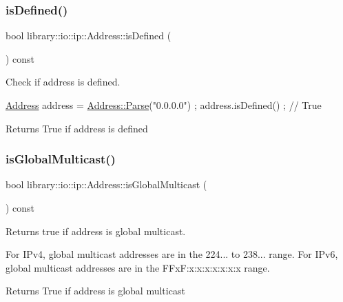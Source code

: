 \subsubsection{\texorpdfstring{is\+Defined()}{isDefined()}}
{\footnotesize\ttfamily bool library\+::io\+::ip\+::\+Address\+::is\+Defined (\begin{DoxyParamCaption}{ }\end{DoxyParamCaption}) const}



Check if address is defined. 


\begin{DoxyCode}
\hyperlink{classlibrary_1_1io_1_1ip_1_1_address_ab968d468b8bc2ba8f48fd2b6784832fe}{Address} address = \hyperlink{classlibrary_1_1io_1_1ip_1_1_address_af8ab0e365de3c00109b456ee94e2590b}{Address::Parse}(\textcolor{stringliteral}{"0.0.0.0"}) ;
address.isDefined() ; \textcolor{comment}{// True}
\end{DoxyCode}


\begin{DoxyReturn}{Returns}
True if address is defined 
\end{DoxyReturn}
\mbox{\label{classlibrary_1_1io_1_1ip_1_1_address_a5e6c384bba26c666b0922be94c41eb0c}} 
\subsubsection{\texorpdfstring{is\+Global\+Multicast()}{isGlobalMulticast()}}
{\footnotesize\ttfamily bool library\+::io\+::ip\+::\+Address\+::is\+Global\+Multicast (\begin{DoxyParamCaption}{ }\end{DoxyParamCaption}) const}



Returns true if address is global multicast. 

For I\+Pv4, global multicast addresses are in the 224... to 238... range. For I\+Pv6, global multicast addresses are in the F\+Fx\+F\+:x\+:x\+:x\+:x\+:x\+:x\+:x range.

\begin{DoxyReturn}{Returns}
True if address is global multicast 
\end{DoxyReturn}
\mbox{\label{classlibrary_1_1io_1_1ip_1_1_address_a47df4ff73e75b42155cb59f327064c56}} 
